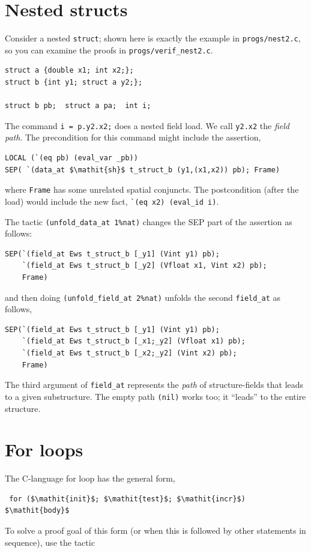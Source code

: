 \documentclass[12pt,fleqn,openany,oneside,showtrims]{memoir}
\newcommand{\ychapter}[2]{\chapter[#1]{#1 \hfill \normalsize #2}}
\begin{document}
\ychapter{Nested structs}{}
Consider a nested \lstinline{struct}; shown here is exactly the
example in \lstinline{progs/nest2.c}, so you can examine the proofs in
\lstinline{progs/verif_nest2.c}.
\begin{lstlisting}
struct a {double x1; int x2;};
struct b {int y1; struct a y2;};

struct b pb;  struct a pa;  int i;
\end{lstlisting}
The command  \lstinline{i = p.y2.x2;} does a nested field load.
We call \lstinline{y2.x2} the \emph{field path}.
The precondition for this command might include the assertion,
\begin{lstlisting}
LOCAL (`(eq pb) (eval_var _pb)) 
SEP( `(data_at $\mathit{sh}$ t_struct_b (y1,(x1,x2)) pb); Frame)
\end{lstlisting}
where \lstinline{Frame} has some unrelated spatial conjuncts.
The postcondition (after the load) would include the new \LOCAL fact,
\lstinline{`(eq x2) (eval_id i)}.

The tactic \lstinline{(unfold_data_at 1%nat)}
changes the SEP part of the assertion as follows:
\begin{lstlisting}
SEP(`(field_at Ews t_struct_b [_y1] (Vint y1) pb);
    `(field_at Ews t_struct_b [_y2] (Vfloat x1, Vint x2) pb);
    Frame)
\end{lstlisting}
 and then doing \lstinline{(unfold_field_at 2%nat)}
unfolds the second \lstinline{field_at} as follows,
\begin{lstlisting}
SEP(`(field_at Ews t_struct_b [_y1] (Vint y1) pb);
    `(field_at Ews t_struct_b [_x1;_y2] (Vfloat x1) pb);
    `(field_at Ews t_struct_b [_x2;_y2] (Vint x2) pb);
    Frame)
\end{lstlisting}
The third argument of \lstinline{field_at} represents
the \emph{path} of structure-fields that leads to a given
substructure.  The empty path \lstinline{(nil)} 
works too; it ``leads'' to the entire structure.

\ychapter{For loops}{}

The C-language \textsf{for} loop has the general form,
\begin{lstlisting}
 for ($\mathit{init}$; $\mathit{test}$; $\mathit{incr}$) $\mathit{body}$
\end{lstlisting}

To solve a proof goal of this form (or when this is followed by other
statements in sequence), use the tactic
\end{document}
